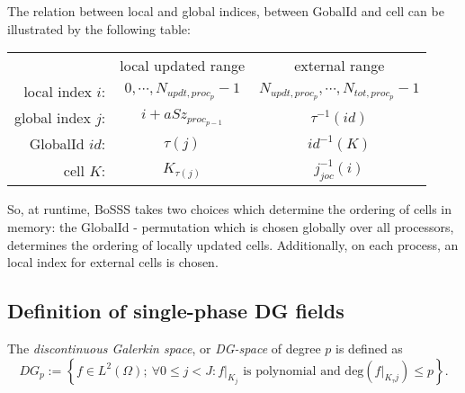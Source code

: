 \begin{myRem}
The relation between local and global indices, between GobalId and cell
can be illustrated by the following table:

\begin{center}
\begin{tabular}{r|c|c}
                    & local updated range             & external range                            \\
  local index $i$:  & $0,\cdots, N_{updt,proc_p}-1$   & $N_{updt,proc_p},\cdots,N_{tot,proc_p}-1$ \\
  global index $j$: & $i + aSz_{proc_{p-1}}$          & $\tau^{-1}(id)$                           \\
  GlobalId $id$:    & $\tau(j)$                       & $id^{-1}(K)$ \\
  cell $K$:         & $K_{\tau(j)}$                   & $j_{joc}^{-1}(i)$ \\
\end{tabular}
\end{center}

So, at runtime, BoSSS takes two choices which determine the ordering of cells
in memory: the GlobalId - permutation which is chosen globally over all processors,
determines the ordering of locally updated cells. Additionally, on each process,
an local index for external cells is chosen.
\end{myRem}

\subsection{Definition of single-phase DG fields}

\begin{myDef}
The \emph{discontinuous Galerkin space}, or \emph{DG-space} of degree $p$
is defined as
\[
  DG_p := \left\{
    f \in L^2(\Omega); \
    \forall 0 \leq j < J:
    f|_{K_j} \textrm{ is polynomial and } \textrm{deg}\left(f|_{K_\tau{j}}\right) \leq p
  \right\}.
\]
\end{myDef}

